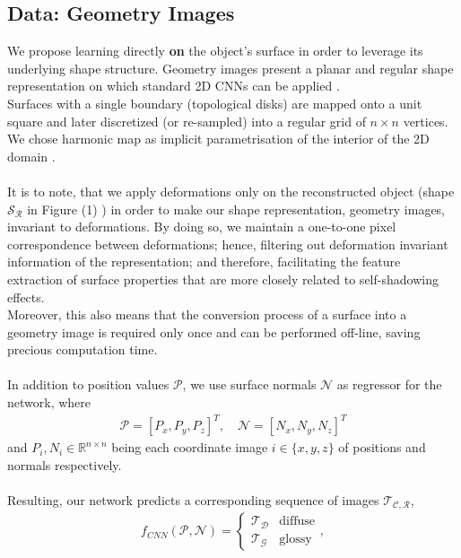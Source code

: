 \subsection{Data: Geometry Images}
We propose learning directly \textbf{on} the object's surface in order to leverage its underlying shape structure. Geometry images present a planar and regular shape representation on which standard 2D CNNs can be applied \cite{gu2002geometry, sinha2016deep}. 
\\ 
Surfaces with a single boundary (topological disks) are mapped onto a unit square and later discretized (or re-sampled) into a regular grid of $n \times n$ vertices. We chose harmonic map as implicit parametrisation of the interior of the 2D domain \cite{HM_book, HarmonicMapping}. \\
\\
It is to note, that we apply deformations only on the reconstructed object (shape $\mathcal{S_R}$ in Figure (1) ) in order to make our shape representation, geometry images, invariant to deformations. By doing so, we maintain a one-to-one pixel correspondence between deformations; hence, filtering out deformation invariant information of the representation; and therefore, facilitating the feature extraction of surface properties that are more closely related to self-shadowing effects. 
\\
Moreover, this also means that the conversion process of a surface into a geometry image is required only once and can be performed off-line, saving precious computation time.\\
\\
In addition to position values  $\mathcal{P}$, we use surface normals $\mathcal{N}$ as regressor for the network, where 
\begin{align*}
	\mathcal{P} = [ P_x, P_y, P_z ]^T , \quad
	\mathcal{N} = [ N_x, N_y, N_z ] ^T 
\end{align*}
and  $P_i, N_i \in \mathbb{R}^{n \times n }$ being each coordinate image  $i \in \{ x,y,z\}$ of positions and normals respectively. 
\\
\\
Resulting, our network predicts a corresponding sequence of images $\mathcal{T_{C,R}}$,
\begin{align*}
	f_{CNN} (  \mathcal{P} , \mathcal{N} ) = 
	\begin{cases}
	\mathcal{T_D}  & \text{diffuse} \\
	\mathcal{T_G} & \text{glossy}
	\end{cases},
\end{align*}
